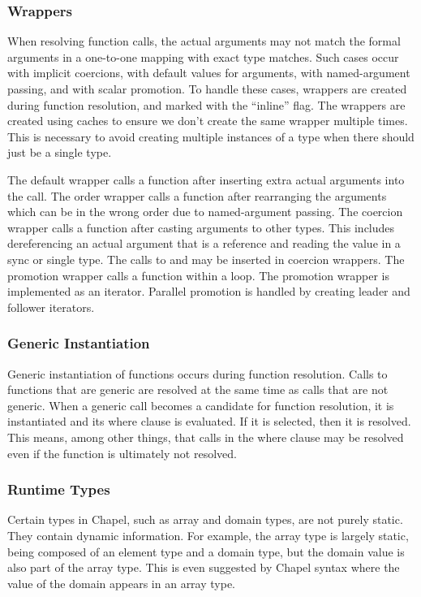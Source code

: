 \documentclass[10pt]{article}
\begin{document}
\subsubsection{Wrappers}

When resolving function calls, the actual arguments may not match the
formal arguments in a one-to-one mapping with exact type matches.
Such cases occur with implicit coercions, with default values for
arguments, with named-argument passing, and with scalar promotion.  To
handle these cases, wrappers are created during function resolution,
and marked with the ``inline'' flag.  The wrappers are created using
caches to ensure we don't create the same wrapper multiple times.
This is necessary to avoid creating multiple instances of a type when
there should just be a single type.

The default wrapper calls a function after inserting extra actual
arguments into the call.  The order wrapper calls a function after
rearranging the arguments which can be in the wrong order due to
named-argument passing.  The coercion wrapper calls a function after
casting arguments to other types.  This includes dereferencing an
actual argument that is a reference and reading the value in a sync or
single type.  The calls to  and  may be
inserted in coercion wrappers.  The promotion wrapper calls a function
within a loop.  The promotion wrapper is implemented as an iterator.
Parallel promotion is handled by creating leader and follower
iterators.

\subsubsection{Generic Instantiation}

Generic instantiation of functions occurs during function resolution.
Calls to functions that are generic are resolved at the same time as
calls that are not generic.  When a generic call becomes a candidate
for function resolution, it is instantiated and its where clause is
evaluated.  If it is selected, then it is resolved.  This means, among
other things, that calls in the where clause may be resolved even if
the function is ultimately not resolved.

\subsubsection{Runtime Types}

Certain types in Chapel, such as array and domain types, are not
purely static.  They contain dynamic information.  For example, the
array type is largely static, being composed of an element type and a
domain type, but the domain value is also part of the array type.
This is even suggested by Chapel syntax where the value of the domain
appears in an array type.
\end{document}
